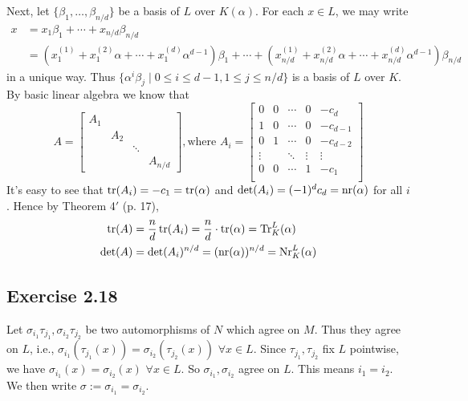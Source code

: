 \documentclass[../Marcus.tex]{subfiles}
\begin{document}
Next, let $\{\beta_1,\ldots,\beta_{n/d}\}$ be a basis of $L$ over $K(\alpha)$. For each $x\in L$, we may write
\begin{align*}
    x &= x_1\beta_1+\cdots+x_{n/d}\beta_{n/d} \\ &=(x^{(1)}_{1}+x^{(2)}_{1}\alpha+\cdots+x^{(d)}_{1}\alpha^{d-1})\beta_1+\cdots+(x^{(1)}_{n/d}+x^{(2)}_{n/d}\alpha+\cdots+x^{(d)}_{n/d}\alpha^{d-1})\beta_{n/d}
\end{align*}
in a unique way. Thus $\{\alpha^{i}\beta_j\mid 0\leq i\leq d-1,1\leq j \leq n/d\}$ is a basis of $L$ over $K$. By basic linear algebra we know that
$$
A=\begin{bmatrix}
    A_1 &         &             &               \\
           & A_2 &             &               \\
           &         & \ddots &               \\
           &         &             & A_{n/d}
\end{bmatrix}, \text{where }
A_i=
\begin{bmatrix}
    0          & 0  & \cdots & 0         & -c_d       \\
    1           & 0 & \cdots & 0          & -c_{d-1} \\
    0          & 1  & \cdots & 0          & -c_{d-2}     \\
    \vdots &     & \ddots & \vdots & \vdots       \\
    0         & 0  & \cdots & 1           & -c_1       \\
\end{bmatrix}
$$
It's easy to see that $\operatorname{tr}(A_i)=-c_1=\operatorname{tr}(\alpha)$ and $\det(A_i)=(-1)^dc_d=\operatorname{nr}(\alpha)$ for all $i$. Hence by Theorem 4$'$ (p. 17),
\begin{align*}
    \operatorname{tr}(A)&=\frac{n}{d}\operatorname{tr}(A_i)=\frac{n}{d}\cdot\operatorname{tr}(\alpha)=\operatorname{Tr}^L_K(\alpha)\\
    \det(A)&=\det(A_i)^{n/d}=(\operatorname{nr}(\alpha))^{n/d}=\operatorname{Nr}^L_K(\alpha)
\end{align*}

\subsection*{Exercise 2.18}

Let $\sigma_{i_1}\tau_{j_1},\sigma_{i_2}\tau_{j_2}$ be two automorphisms of $N$ which agree on $M$. Thus they agree on $L$, i.e., $\sigma_{i_1}(\tau_{j_1}(x))=\sigma_{i_2}(\tau_{j_2}(x))$ $\forall x\in L$. Since $\tau_{j_1},\tau_{j_2}$ fix $L$ pointwise, we have $\sigma_{i_1}(x)=\sigma_{i_2}(x)$ $\forall x\in L$. So $\sigma_{i_1},\sigma_{i_2}$ agree on $L$. This means $i_1=i_2$. We then write $\sigma:=\sigma_{i_1}=\sigma_{i_2}$.
\end{document}
